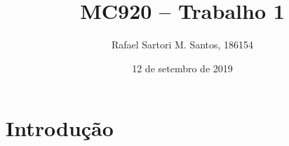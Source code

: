 \documentclass[brazilian,a4paper,twocolumn]{article}
\title{MC920 -- Trabalho 1}
\author{Rafael Sartori M. Santos, 186154}
\date{12 de setembro de 2019}
\begin{document}
\maketitle

\section{Introdução}
\end{document}
